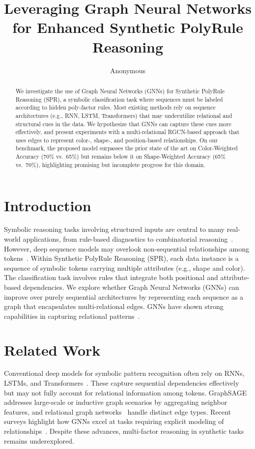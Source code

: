 \documentclass{article} %
\title{Leveraging Graph Neural Networks for Enhanced Synthetic PolyRule Reasoning}
\author{Anonymous}
\theoremstyle{plain}
\theoremstyle{definition}
\theoremstyle{remark}
\begin{document}
\maketitle

\begin{abstract}
We investigate the use of Graph Neural Networks (GNNs) for Synthetic PolyRule Reasoning (SPR), a symbolic classification task where sequences must be labeled according to hidden poly-factor rules. Most existing methods rely on sequence architectures (e.g., RNN, LSTM, Transformers) that may underutilize relational and structural cues in the data. We hypothesize that GNNs can capture these cues more effectively, and present experiments with a multi-relational RGCN-based approach that uses edges to represent color-, shape-, and position-based relationships. On our benchmark, the proposed model surpasses the prior state of the art on Color-Weighted Accuracy (70\% vs.\ 65\%) but remains below it on Shape-Weighted Accuracy (65\% vs.\ 70\%), highlighting promising but incomplete progress for this domain.
\end{abstract}

\section{Introduction}
Symbolic reasoning tasks involving structured inputs are central to many real-world applications, from rule-based diagnostics to combinatorial reasoning~\citep{goodfellow2016deep}. However, deep sequence models may overlook non-sequential relationships among tokens~\citep{shiri2023aco}. Within Synthetic PolyRule Reasoning (SPR), each data instance is a sequence of symbolic tokens carrying multiple attributes (e.g., shape and color). The classification task involves rules that integrate both positional and attribute-based dependencies. We explore whether Graph Neural Networks (GNNs) can improve over purely sequential architectures by representing each sequence as a graph that encapsulates multi-relational edges. GNNs have shown strong capabilities in capturing relational patterns~\citep{khemani2024aro}.

\section{Related Work}
Conventional deep models for symbolic pattern recognition often rely on RNNs, LSTMs, and Transformers~\citep{shiri2023aco}. These capture sequential dependencies effectively but may not fully account for relational information among tokens. GraphSAGE~\citep{hamilton2017inductiverl} addresses large-scale or inductive graph scenarios by aggregating neighbor features, and relational graph networks~\citep{ye2019avr} handle distinct edge types. Recent surveys highlight how GNNs excel at tasks requiring explicit modeling of relationships~\citep{khemani2024aro}. Despite these advances, multi-factor reasoning in synthetic tasks remains underexplored.
\end{document}
